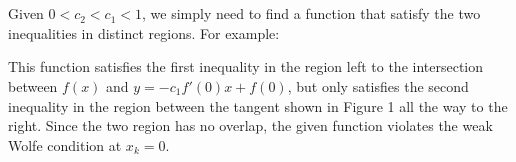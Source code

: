 \documentclass[11pt]{article}
\begin{document}
\maketitle
\section{}
Given $0<c_2<c_1<1$, we simply need to find a function that satisfy the two inequalities in distinct regions. For example:
\begin{figure}[ht]
\end{figure}
This function satisfies the first inequality in the region left to the intersection between $f(x)$ and $y=-c_1f'(0)x+f(0)$, but only satisfies the second inequality in the region between the tangent shown in Figure 1 all the way to the right. Since the two region has no overlap, the given function violates the weak Wolfe condition at $x_k=0$.
\end{document}
